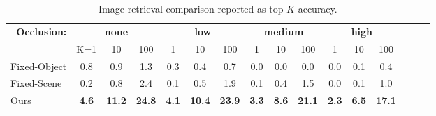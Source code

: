 \begin{table}
    \centering
    \def\arraystretch{1.1}
    \begin{tabular}{l|ccc|ccc|ccc|ccc|ccc|}
        \multicolumn{1}{r}{\textbf{Occlusion:}}&\multicolumn{3}{c}{\textbf{none}} & \multicolumn{3}{c}{\textbf{low}} & \multicolumn{3}{c}{\textbf{medium}} & \multicolumn{3}{c}{\textbf{high}} \\
        \cline{2-13}
        & K=1 & 10 & 100 &
        1 & 10 & 100 & 
        1 & 10 & 100 & 
        1 & 10 & 100 \\
        \cline{1-13}
        \multicolumn{1}{|l|}{{\sc Fixed-Object}} & 
        0.8 & 0.9 & 1.3 &
        0.3 & 0.4 & 0.7 & 
        0.0 & 0.0 & 0.0 & 
        0.0 & 0.1 & 0.4 \\
        \multicolumn{1}{|l|}{{\sc Fixed-Scene}} & 
        0.2 & 0.8 & 2.4 &
        0.1 & 0.5 & 1.9 & 
        0.1 & 0.4 & 1.5 & 
        0.0 & 0.1 & 1.0 \\
        \multicolumn{1}{|l|}{Ours} & 
        \textbf{4.6} & \textbf{11.2} & \textbf{24.8} &
        \textbf{4.1} & \textbf{10.4} & \textbf{23.9} & 
        \textbf{3.3} & \textbf{8.6} & \textbf{21.1} & 
        \textbf{2.3} & \textbf{6.5} & \textbf{17.1} \\
        \cline{1-13}
    \end{tabular}
    \caption{Image retrieval comparison reported as top-$K$ accuracy.}
    \label{tab:topK_accuracy}
\end{table}

